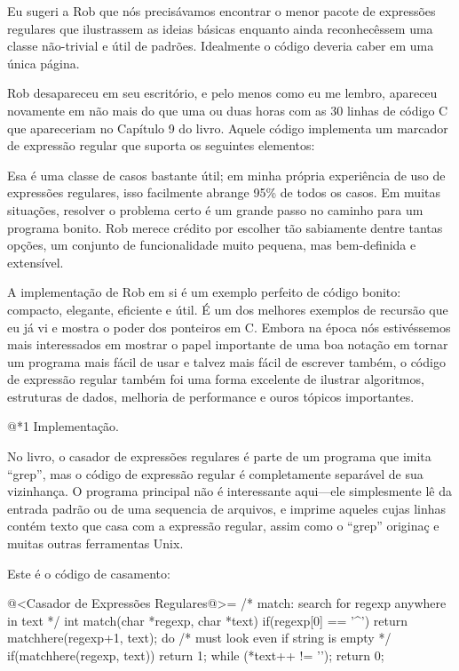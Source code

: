 Eu sugeri a Rob que nós precisávamos encontrar o menor pacote de
expressões regulares que ilustrassem as ideias básicas enquanto ainda
reconhecêssem uma classe não-trivial e útil de padrões. Idealmente o
código deveria caber em uma única página.

Rob desapareceu em seu escritório, e pelo menos como eu me lembro,
apareceu novamente em não mais do que uma ou duas horas com as 30
linhas de código C que apareceriam no Capítulo 9 do livro. Aquele
código implementa um marcador de expressão regular que suporta os
seguintes elementos:


Esa é uma classe de casos bastante útil; em minha própria experiência
de uso de expressões regulares, isso facilmente abrange 95\% de todos
os casos. Em muitas situações, resolver o problema certo é um grande
passo no caminho para um programa bonito. Rob merece crédito por
escolher tão sabiamente dentre tantas opções, um conjunto de
funcionalidade muito pequena, mas bem-definida e extensível.

A implementação de Rob em si é um exemplo perfeito de código bonito:
compacto, elegante, eficiente e útil. É um dos melhores exemplos de
recursão que eu já vi e mostra o poder dos ponteiros em C. Embora na
época nós estivéssemos mais interessados em mostrar o papel importante
de uma boa notação em tornar um programa mais fácil de usar e talvez
mais fácil de escrever também, o código de expressão regular também
foi uma forma excelente de ilustrar algoritmos, estruturas de dados,
melhoria de performance e ouros tópicos importantes.

@*1 Implementação.

No livro, o casador de expressões regulares é parte de um programa que
imita ``grep'', mas o código de expressão regular é completamente
separável de sua vizinhança. O programa principal não é interessante
aqui---ele simplesmente lê da entrada padrão ou de uma sequencia de
arquivos, e imprime aqueles cujas linhas contém texto que casa com a
expressão regular, assim como o ``grep'' originaç e muitas outras
ferramentas Unix.

Este é o código de casamento:

@<Casador de Expressões Regulares@>=
/* match: search for regexp anywhere in text */
int match(char *regexp, char *text){
  if(regexp[0] == '^')
    return matchhere(regexp+1, text);
  do{    /* must look even if string is empty */
    if(matchhere(regexp, text))
      return 1;
  } while (*text++ != '\0');
  return 0;
}

